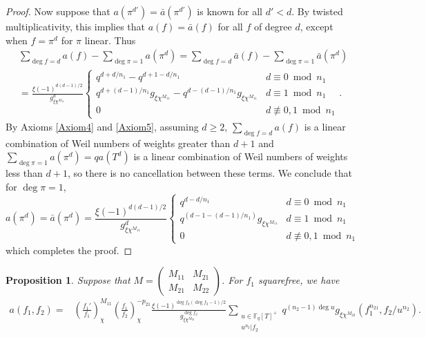 \documentclass[11pt,letterpaper]{article}
\newtheorem{prop}[theorem]{Proposition}
\theoremstyle{definition}
\theoremstyle{remark}
\numberwithin{equation}{section}
\theoremstyle{dotless}
\newcommand{\F}{\mathbb{F}}
\newcommand{\res}[2]{\left(\frac{#1}{#2}\right)}
\begin{document}
\begin{proof}
Now suppose that $a(\pi^{d'})=\bar{a}(\pi^{d'})$ is known for all $d'<d$. By twisted multiplicativity, this implies that $a(f)=\bar{a}(f)$ for all $f$ of degree $d$, except when $f=\pi^d$ for $\pi$ linear. Thus 
\begin{equation*}
\begin{split}
&\sum_{\deg f = d} a(f) - \sum_{\deg \pi = 1} a(\pi^d)  =\sum_{\deg f = d} \bar{a}(f) -\sum_{\deg \pi = 1} \bar{a}(\pi^d) \\
&=\frac{\xi(-1)^{d(d-1)/2}}{g_{\xi \chi^{M_{11}}}^d} 
\left\lbrace \begin{array}{cc} 
q^{d+d/n_1}-q^{d+1-d/n_1} & d \equiv 0 \bmod n_1 \\
q^{d+(d-1)/n_1}g_{\xi \chi^{M_{11}}}-q^{d-(d-1)/n_1}g_{\xi \chi^{M_{11}}} & d \equiv 1 \bmod n_1 \\
0 & d \not \equiv 0, 1 \bmod n_1
\end{array} \right. .
\end{split}
\end{equation*}
By Axioms \ref{Axiom4} and \ref{Axiom5}, assuming $d\geq 2$, $\sum_{\deg f = d} a(f)$ is a linear combination of Weil numbers of weights greater than $d+1$ and $\sum_{\deg \pi = 1} a(\pi^d) = q a(T^d)$ is a linear combination of Weil numbers of weights less than $d+1$, so there is no cancellation between these terms.  We conclude that for $\deg \pi =1$, 
\begin{equation*}
a(\pi^d)  = \bar{a}(\pi^d) = \frac{\xi(-1)^{d(d-1)/2}}{g_{\xi \chi^{M_{11}}}^d} 
\left\lbrace \begin{array}{cc} 
q^{d-d/n_1} & d \equiv 0 \bmod n_1 \\
q^{(d-1-(d-1)/n_1)}g_{\xi \chi^{M_{11}}} & d \equiv 1 \bmod n_1 \\
0 & d \not \equiv 0, 1 \bmod n_1
\end{array} \right.
\end{equation*}
which completes the proof.
\end{proof} 

\begin{prop}\label{PropCoeff2}
Suppose that $M=\begin{pmatrix} M_{11} & M_{21}  \\ M_{21} & M_{22} \end{pmatrix}$. For $f_1$ squarefree, we have 
\begin{equation}\label{Coeff2}
\begin{split}
a(f_1, f_2) = &\res{f_1'}{f_1}^{M_{11}}_{\chi} \res{f_1}{f_2}_{\chi}^{-p_{21}} \frac{\xi(-1)^{\deg f_2(\deg f_2 -1)/2}}{g_{\xi \chi^{M_{22}}}^{\deg f_2}}  \sum_{\substack{u \in \F_q[T]^+ \\ u^{n_2}|f_2}} q^{(n_2-1)\deg u} g_{\xi \chi^{M_{22}}}(f_1^{n_{21}}, f_2/u^{n_2}).
\end{split}
\end{equation}
\end{prop}
\end{document}
